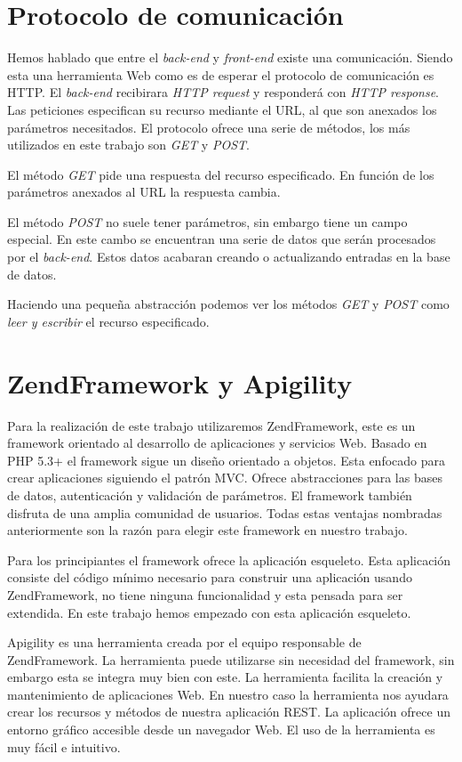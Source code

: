 \section{Protocolo de comunicación}
  	Hemos hablado que entre el \emph{back-end} y \emph{front-end} existe una comunicación. Siendo esta una herramienta Web como es de esperar el
	protocolo de comunicación es HTTP\cite{HTTP}. El \emph{back-end} recibirara \emph{HTTP request} y responderá con \emph{HTTP response}. Las
	peticiones especifican su recurso mediante el URL, al que son anexados los parámetros necesitados. El protocolo ofrece una serie de
	métodos, los más utilizados en este trabajo son \emph{GET} y \emph{POST}. 
	\par
	El método \emph{GET} pide una respuesta del recurso especificado. En función de los parámetros anexados al URL la respuesta cambia.
	\par
	El método \emph{POST} no suele tener parámetros, sin embargo tiene un campo especial. En este cambo se encuentran una serie de datos que serán
	procesados por el \emph{back-end}. Estos datos acabaran creando o actualizando entradas en la base de datos. 
	\par
	Haciendo una pequeña abstracción podemos ver los métodos \emph{GET} y \emph{POST} como \emph{leer y escribir} el recurso especificado.
\section{ZendFramework y Apigility}
	Para la realización de este trabajo utilizaremos ZendFramework, este es un framework orientado al desarrollo de aplicaciones y servicios Web.
	Basado en PHP 5.3+ el framework sigue un diseño orientado a objetos. Esta enfocado para crear aplicaciones siguiendo el patrón MVC. Ofrece
	abstracciones para las bases de datos, autenticación y validación de parámetros. El framework también disfruta de una amplia comunidad de 
	usuarios. Todas estas ventajas nombradas anteriormente son la razón para elegir este framework en nuestro trabajo.
	\par
 	Para  los principiantes el framework ofrece la aplicación esqueleto. Esta aplicación consiste del código mínimo necesario para construir una
	aplicación usando ZendFramework, no tiene ninguna funcionalidad y esta pensada para ser extendida. En este trabajo hemos empezado con esta
	aplicación esqueleto.
  	\par 
  	Apigility es una herramienta creada por el equipo responsable de ZendFramework. La herramienta puede utilizarse sin necesidad del framework,
	sin embargo esta se integra muy bien con este. La herramienta facilita la creación y mantenimiento de aplicaciones Web. En nuestro caso la
	herramienta nos ayudara crear los recursos y métodos de nuestra aplicación REST. La aplicación ofrece un entorno gráfico accesible desde un
	navegador Web. El uso de la herramienta es muy fácil e intuitivo.
